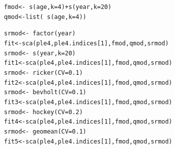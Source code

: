 \documentclass[a4paper,english,10pt]{article}\usepackage[]{graphicx}\usepackage[]{color}
\makeatletter
\newcommand{\hlnum}[1]{\textcolor[rgb]{0.063,0.58,0.627}{#1}}%
\newcommand{\hlopt}[1]{\textcolor[rgb]{0.196,0.196,0.196}{#1}}%
\newcommand{\hlstd}[1]{\textcolor[rgb]{0.196,0.196,0.196}{#1}}%
\newcommand{\hlkwb}[1]{\textcolor[rgb]{0.627,0,0.314}{#1}}%
\newcommand{\hlkwc}[1]{\textcolor[rgb]{0,0.631,0.314}{#1}}%
\newcommand{\hlkwd}[1]{\textcolor[rgb]{0.78,0.227,0.412}{#1}}%
\newenvironment{kframe}{%
 \def\at@end@of@kframe{}%
 \ifinner\ifhmode%
  \def\at@end@of@kframe{\end{minipage}}%
  \begin{minipage}{\columnwidth}%
 \fi\fi%
 \def\FrameCommand##1{\hskip\@totalleftmargin \hskip-\fboxsep
 \colorbox{shadecolor}{##1}\hskip-\fboxsep
     \hskip-\linewidth \hskip-\@totalleftmargin \hskip\columnwidth}%
 \MakeFramed {\advance\hsize-\width
   \@totalleftmargin\z@ \linewidth\hsize
   \@setminipage}}%
 {\par\unskip\endMakeFramed%
 \at@end@of@kframe}
\newenvironment{knitrout}{}{} %
\makeatother
\begin{document}
\begin{knitrout}
\color{fgcolor}\begin{kframe}
\begin{alltt}
\hlstd{fmod} \hlkwb{<-} \hlopt{~}\hlkwd{s}\hlstd{(age,} \hlkwc{k} \hlstd{=} \hlnum{4}\hlstd{)} \hlopt{+} \hlkwd{s}\hlstd{(year,} \hlkwc{k} \hlstd{=} \hlnum{20}\hlstd{)}
\hlstd{qmod} \hlkwb{<-} \hlkwd{list}\hlstd{(}\hlopt{~}\hlkwd{s}\hlstd{(age,} \hlkwc{k} \hlstd{=} \hlnum{4}\hlstd{))}
\end{alltt}
\end{kframe}
\end{knitrout}

\begin{knitrout}
\color{fgcolor}\begin{kframe}
\begin{alltt}
\hlstd{srmod} \hlkwb{<-} \hlopt{~}\hlkwd{factor}\hlstd{(year)}
\hlstd{fit} \hlkwb{<-} \hlkwd{sca}\hlstd{(ple4, ple4.indices[}\hlnum{1}\hlstd{], fmod, qmod, srmod)}
\hlstd{srmod} \hlkwb{<-} \hlopt{~}\hlkwd{s}\hlstd{(year,} \hlkwc{k} \hlstd{=} \hlnum{20}\hlstd{)}
\hlstd{fit1} \hlkwb{<-} \hlkwd{sca}\hlstd{(ple4, ple4.indices[}\hlnum{1}\hlstd{], fmod, qmod, srmod)}
\hlstd{srmod} \hlkwb{<-} \hlopt{~}\hlkwd{ricker}\hlstd{(}\hlkwc{CV} \hlstd{=} \hlnum{0.1}\hlstd{)}
\hlstd{fit2} \hlkwb{<-} \hlkwd{sca}\hlstd{(ple4, ple4.indices[}\hlnum{1}\hlstd{], fmod, qmod, srmod)}
\hlstd{srmod} \hlkwb{<-} \hlopt{~}\hlkwd{bevholt}\hlstd{(}\hlkwc{CV} \hlstd{=} \hlnum{0.1}\hlstd{)}
\hlstd{fit3} \hlkwb{<-} \hlkwd{sca}\hlstd{(ple4, ple4.indices[}\hlnum{1}\hlstd{], fmod, qmod, srmod)}
\hlstd{srmod} \hlkwb{<-} \hlopt{~}\hlkwd{hockey}\hlstd{(}\hlkwc{CV} \hlstd{=} \hlnum{0.2}\hlstd{)}
\hlstd{fit4} \hlkwb{<-} \hlkwd{sca}\hlstd{(ple4, ple4.indices[}\hlnum{1}\hlstd{], fmod, qmod, srmod)}
\hlstd{srmod} \hlkwb{<-} \hlopt{~}\hlkwd{geomean}\hlstd{(}\hlkwc{CV} \hlstd{=} \hlnum{0.1}\hlstd{)}
\hlstd{fit5} \hlkwb{<-} \hlkwd{sca}\hlstd{(ple4, ple4.indices[}\hlnum{1}\hlstd{], fmod, qmod, srmod)}
\end{alltt}
\end{kframe}
\end{knitrout}
\end{document}
